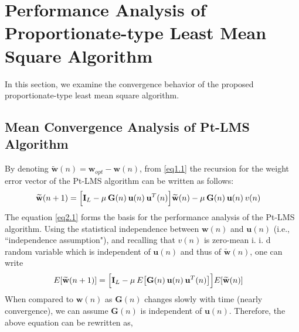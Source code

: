\documentclass[journal, one column]{IEEEtran}
\begin{document}
\section{Performance Analysis of Proportionate-type Least Mean Square Algorithm}
In this section, we examine the convergence behavior of the
proposed proportionate-type least mean square algorithm.
\subsection{Mean Convergence Analysis of Pt-LMS Algorithm}
By denoting $\widetilde{\textbf{w}}(n)= \textbf{w}_{opt}-\textbf{w}(n)$, from \eqref{eq1.1} the recursion for the weight error vector of the Pt-LMS algorithm can be written as follows:
\begin{equation}\label{eq2.1}
\begin{split}
\widetilde{\textbf{w}}(n+1)&=\Big[\textbf{I}_{L}-\mu \hspace{0.2em} \textbf{G}(n) \hspace{0.2em} \textbf{u}(n) \hspace{0.2em} \textbf{u}^{T}(n) \Big] \widetilde{\textbf{w}}(n)
 -\mu \hspace{0.2em} \textbf{G}(n) \hspace{0.2em} \textbf{u}(n) \hspace{0.2em} v(n)
\end{split}
\end{equation}
The equation \eqref{eq2.1} forms the basis for the performance analysis of the Pt-LMS algorithm. Using the statistical independence between
$\textbf{w}(n)$ and $\textbf{u}(n)$ (i.e., ``independence assumption"), and recalling that $v(n)$ is zero-mean i. i. d random variable which is independent of $\textbf{u}(n)$ and thus of $\widetilde{\textbf{w}}(n)$, one can write
\begin{equation}\label{eq2.2}
\begin{split}
E[\widetilde{\textbf{w}}(n+1)]&=\Big[\textbf{I}_{L}-\mu \hspace{0.2em} E\big[\textbf{G}(n) \hspace{0.2em} \textbf{u}(n) \hspace{0.2em} \textbf{u}^{T}(n) \big]\Big] E[\widetilde{\textbf{w}}(n)]
\end{split}
\end{equation}
When compared to $\textbf{w}(n)$ as $\textbf{G}(n)$ changes slowly with time (nearly convergence), we can assume $\textbf{G}(n)$ is independent of $\textbf{u}(n)$. Therefore, the above equation can be rewritten as,
\end{document}
